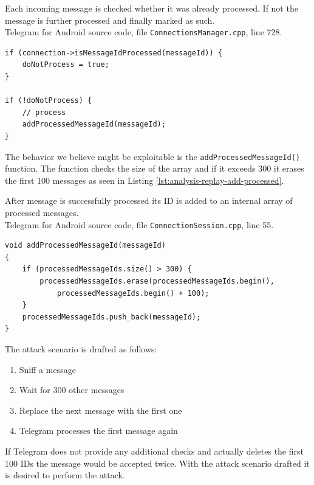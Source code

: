 \documentclass[thesis=M,english]{FITthesis}[2012/10/20]
\begin{document}
\begin{listing}[htb]
\caption{Each incoming message is checked whether it was already processed. If not the message is further processed and finally marked as such.
\protect\\ Telegram for Android source code, file \texttt{ConnectionsManager.cpp}, line 728.}
\label{lst:analysis-replay-check}
\begin{verbatim}
if (connection->isMessageIdProcessed(messageId)) {
    doNotProcess = true;
}

if (!doNotProcess) {
    // process
    addProcessedMessageId(messageId);
}
\end{verbatim}
\end{listing}


The behavior we believe might be exploitable is the \texttt{addProcessedMessageId()} function. The function checks the size of the array and if it exceeds 300 it erases the first 100 messages as seen in Listing \ref{lst:analysis-replay-add-processed}.


\begin{listing}[htb]
\caption{After message is successfully processed its ID is added to an internal array of processed messages.
\protect\\ Telegram for Android source code, file \texttt{ConnectionSession.cpp}, line 55.}
\label{lst:analysis-replay-add-processed}
\begin{verbatim}
void addProcessedMessageId(messageId)
{
    if (processedMessageIds.size() > 300) {
        processedMessageIds.erase(processedMessageIds.begin(),
            processedMessageIds.begin() + 100);
    }
    processedMessageIds.push_back(messageId);
}
\end{verbatim}
\end{listing}

The attack scenario is drafted as follows:

\begin{enumerate}
	\item Sniff a message
	\item Wait for 300 other messages
	\item Replace the next message with the first one
	\item Telegram processes the first message again
\end{enumerate}

If Telegram does not provide any additional checks and actually deletes the first 100 IDs the message would be accepted twice. With the attack scenario drafted it is desired to perform the attack.
\end{document}
